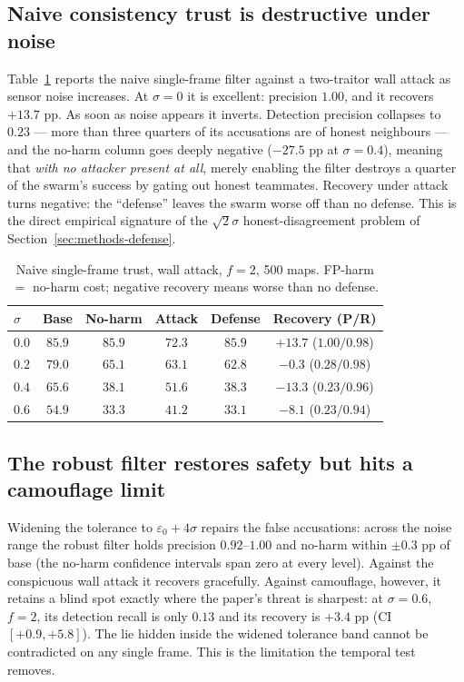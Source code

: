 \subsection{Naive consistency trust is destructive under noise}\label{sec:res-naive}
Table~\ref{tab:naive} reports the naive single-frame filter against a
two-traitor wall attack as sensor noise increases. At $\sigma=0$ it is
excellent: precision $1.00$, and it recovers $+13.7$ pp. As soon as noise
appears it inverts. Detection precision collapses to $0.23$ --- more than
three quarters of its accusations are of honest neighbours --- and the
no-harm column goes deeply negative ($-27.5$ pp at $\sigma=0.4$), meaning
that \emph{with no attacker present at all}, merely enabling the filter
destroys a quarter of the swarm's success by gating out honest teammates.
Recovery under attack turns negative: the ``defense'' leaves the swarm worse
off than no defense. This is the direct empirical signature of the
$\sqrt{2}\sigma$ honest-disagreement problem of
Section~\ref{sec:methods-defense}.

\begin{table}[t]\centering
\caption{Naive single-frame trust, wall attack, $f=2$, 500 maps.
FP-harm $=$ no-harm cost; negative recovery means worse than no defense.}
\label{tab:naive}
\begin{tabular}{lccccc}
\toprule
$\sigma$ & Base & No-harm & Attack & Defense & Recovery (P/R)\\
\midrule
$0.0$ & $85.9$ & $85.9$ & $72.3$ & $85.9$ & $+13.7$ ($1.00/0.98$)\\
$0.2$ & $79.0$ & $65.1$ & $63.1$ & $62.8$ & $-0.3$ ($0.28/0.98$)\\
$0.4$ & $65.6$ & $38.1$ & $51.6$ & $38.3$ & $-13.3$ ($0.23/0.96$)\\
$0.6$ & $54.9$ & $33.3$ & $41.2$ & $33.1$ & $-8.1$ ($0.23/0.94$)\\
\bottomrule
\end{tabular}
\end{table}

\subsection{The robust filter restores safety but hits a camouflage limit}\label{sec:res-robust}
Widening the tolerance to $\varepsilon_0+4\sigma$ repairs the false
accusations: across the noise range the robust filter holds precision
$0.92$--$1.00$ and no-harm within $\pm0.3$ pp of base (the no-harm
confidence intervals span zero at every level). Against the conspicuous
wall attack it recovers gracefully. Against camouflage, however, it retains
a blind spot exactly where the paper's threat is sharpest: at $\sigma=0.6$,
$f=2$, its detection recall is only $0.13$ and its recovery is $+3.4$ pp
(CI $[+0.9,+5.8]$). The lie hidden inside the widened tolerance band cannot
be contradicted on any single frame. This is the limitation the temporal
test removes.

